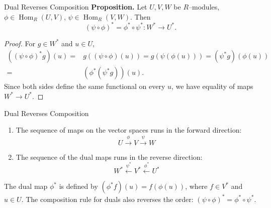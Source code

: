 \begin{frame}{Dual Reverses Composition}
\textbf{Proposition.} Let $U,V,W$ be $R$–modules, $\phi\in\operatorname{Hom}_R(U,V)$, $\psi\in\operatorname{Hom}_R(V,W)$. Then
\[
(\psi\circ \phi)^*=\phi^*\circ \psi^* : W^*\to U^*.
\]

\begin{proof}
For $g\in W^*$ and $u\in U$,
\begin{align*}
    \left((\psi\circ \phi)^* g\right)(u)=&g\left((\psi\circ \phi)(u)\right)=g\left(\psi(\phi(u))\right)=(\psi^* g)\left(\phi(u)\right)\\
=&(\phi^*(\psi^* g))(u).    
\end{align*}
Since both sides define the same functional on every $u$, we have equality of maps $W^*\to U^*$.
\end{proof}

\end{frame}

\begin{frame}{Dual Reverses Composition}
\begin{block}{}
\begin{enumerate}
    \item The sequence of maps on the vector spaces runs in the forward direction:
    $$ U \xrightarrow{\phi} V \xrightarrow{\psi} W $$
    \item The sequence of the dual maps runs in the reverse direction:
    $$ W^* \xleftarrow{\psi^*} V^* \xleftarrow{\phi^*} U^* $$
\end{enumerate}
The dual map $\phi^*$ is defined by $(\phi^* f)(u) = f(\phi(u))$, where $f \in V^*$ and $u \in U$. The composition rule for duals also reverses the order: $(\psi \circ \phi)^* = \phi^* \circ \psi^*$.


\end{block}
    
\end{frame}

